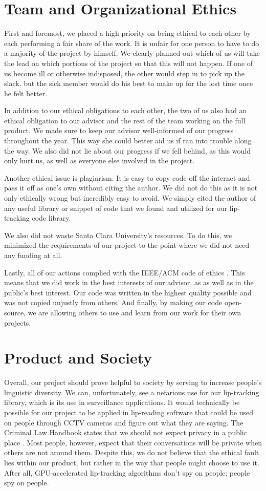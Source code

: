 \section{Team and Organizational Ethics}
First and foremost, we placed a high priority on being ethical to each other by each performing a fair share of the work. It is unfair for one person to have to do a majority of the project by himself. We clearly planned out which of us will take the lead on which portions of the project so that this will not happen. If one of us become ill or otherwise indisposed, the other would step in to pick up the slack, but the sick member would do his best to make up for the lost time once he felt better.

In addition to our ethical obligations to each other, the two of us also had an ethical obligation to our advisor and the rest of the team working on the full product. We made sure to keep our advisor well-informed of our progress throughout the year. This way she could better aid us if ran into trouble along the way. We also did not lie about our progress if we fell behind, as this would only hurt us, as well as everyone else involved in the project.

Another ethical issue is plagiarism. It is easy to copy code off the internet and pass it off as one's own without citing the author. We did not do this as it is not only ethically wrong but incredibly easy to avoid. We simply cited the author of any useful library or snippet of code that we found and utilized for our lip-tracking code library.

We also did not waste Santa Clara University's resources. To do this, we minimized the requirements of our project to the point where we did not need any funding at all. 

Lastly, all of our actions complied with the IEEE/ACM code of ethics \cite{acm-ethics}. This means that we did work in the best interests of our advisor, as as well as in the public's best interest. Our code was written in the highest quality possible and was not copied unjustly from others. And finally, by making our code open-source, we are allowing others to use and learn from our work for their own projects. 


\section{Product and Society}
Overall, our project should prove helpful to society by serving to increase people's linguistic diversity. We can, unfortunately, see a nefarious use for our lip-tracking library, which is its use in surveillance applications. It would technically be possible for our project to be applied in lip-reading software that could be used on people through CCTV cameras and figure out what they are saying. The Criminal Law Handbook states that we should not expect privacy in a public place \cite{criminal-law}. Most people, however, expect that their conversations will be private when others are not around them. Despite this, we do not believe that the ethical fault lies within our product, but rather in the way that people might choose to use it. After all, GPU-accelerated lip-tracking algorithms don't spy on people; people spy on people. 

